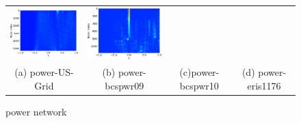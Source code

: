 \documentclass[senior,final,11pt]{iscs-thesis}
\begin{document}
\begin{figure}[htbp]
\begin{tabular}{cccc}
    \includegraphics[width=45mm]{figure/power-bcspwr10mtx_pdos.png} &
    \includegraphics[width=45mm]{figure/power-eris1176mtx_pdos.png} \\
    (a) power-US-Grid & (b) power-bcspwr09 & (c)power-bcspwr10  & (d) power-eris1176\\ [6pt]
  \end{tabular}
  \caption{power network}
  \label{fig:power }
\end{figure}
\end{document}
